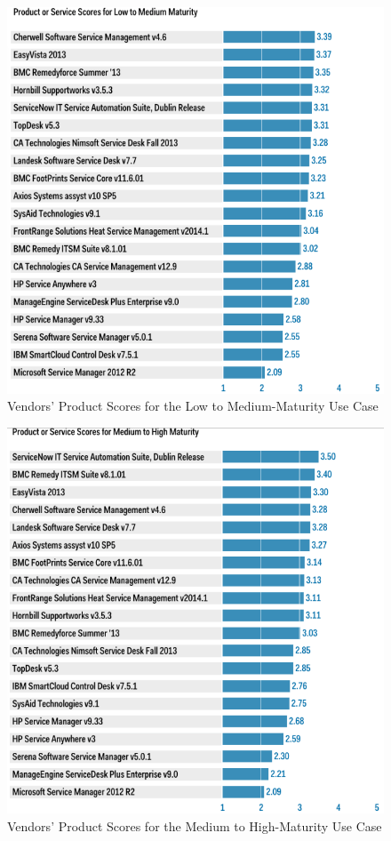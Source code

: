 \begin{figure}
\centering
\includegraphics{img/LowMediumScores.png}
\caption{Vendors' Product Scores for the Low to Medium-Maturity Use Case}
\end{figure}

\begin{figure}
\centering
\includegraphics{img/MediumHighScores.png}
\caption{Vendors' Product Scores for the Medium to High-Maturity Use Case}
\end{figure}

